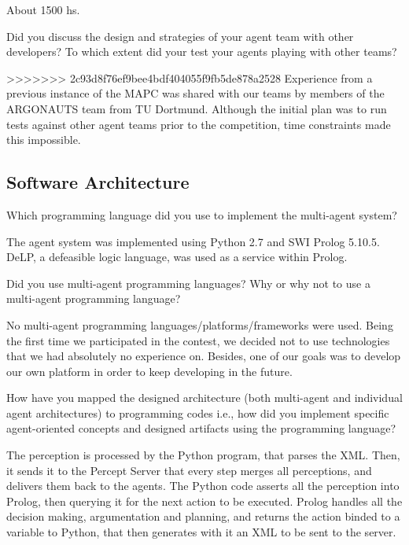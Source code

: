 
About 1500 hs.

\begin{question}
Did you discuss the design and strategies of your agent team with other
developers? To which extent did your test your agents playing with other
teams?
\end{question}

>>>>>>> 2c93d8f76ef9bee4bdf404055f9fb5de878a2528
Experience from a previous instance of the MAPC was shared with our
teams by members of the ARGONAUTS team from TU Dortmund\cite{Holzgen:2011}. 
Although the initial plan was to run tests against other agent teams prior to the
competition, time constraints made this impossible.

\subsection{Software Architecture}
\setcounter{question}{0}
\begin{question}
Which programming language did you use to
implement the multi-agent system?  
\end{question}

The agent system was implemented using
Python 2.7 and SWI Prolog 5.10.5. DeLP, a defeasible logic language, was used
as a service within Prolog.

\begin{question}
Did you use multi-agent programming languages? Why or why not to use a
multi-agent programming language?  
\end{question}

No multi-agent programming
languages/platforms/frameworks were used. Being the first time we participated
in the contest, we decided not to use technologies that we had absolutely no experience on. Besides,
one of our goals was to develop our own platform in order to keep developing in the future.

\begin{question}
How have you mapped the designed architecture (both multi-agent and
individual agent architectures) to programming codes i.e., how did you
implement specific agent-oriented concepts and designed artifacts using the
programming language?  
\end{question}

The perception is processed by the Python program, that
parses the XML. Then, it sends it to the Percept Server that every step merges
all perceptions, and delivers them back to the agents.  The Python code
asserts all the perception into Prolog, then querying it for the next action
to be executed.  Prolog handles all the decision making, argumentation and
planning, and returns the action binded to a variable to Python, that then
generates with it an XML to be sent to the server.

